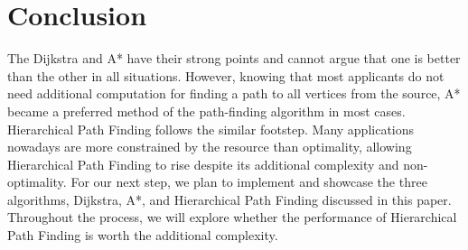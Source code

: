 \documentclass{article}
\begin{document}
\section{Conclusion}
The Dijkstra and A* have their strong points and cannot argue that one is better than the other in all situations. However, knowing that most applicants do not need additional computation for finding a path to all vertices from the source, A* became a preferred method of the path-finding algorithm in most cases. Hierarchical Path Finding follows the similar footstep. Many applications nowadays are more constrained by the resource than optimality, allowing Hierarchical Path Finding to rise despite its additional complexity and non-optimality. For our next step, we plan to implement and showcase the three algorithms, Dijkstra, A*, and Hierarchical Path Finding discussed in this paper. Throughout the process, we will explore whether the performance of Hierarchical Path Finding is worth the additional complexity.


\medskip
 


 
\end{document}
